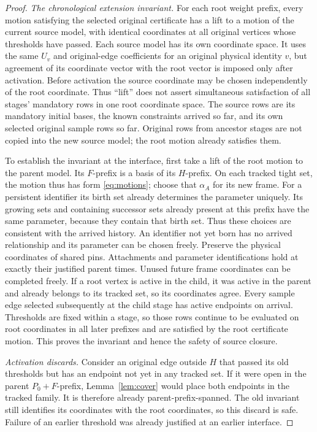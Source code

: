\documentclass[11pt,a4paper]{article}
\theoremstyle{definition}
\theoremstyle{remark}
\begin{document}
\begin{proof}
\emph{The chronological extension invariant.}
For each root weight prefix, every motion satisfying
the selected original certificate has a lift to a motion
of the current source model, with identical coordinates
at all original vertices whose thresholds have passed.
Each source model has its own coordinate space. It uses the same
$U_v$ and original-edge coefficients for an original physical
identity $v$, but agreement of its coordinate vector with the
root vector is imposed only after activation. Before activation
the source coordinate may be chosen independently of the root
coordinate. Thus ``lift'' does not assert simultaneous satisfaction
of all stages' mandatory rows in one root coordinate space.
The source rows are its mandatory initial bases,
the known constraints arrived so far, and its own
selected original sample rows so far.
Original rows from ancestor stages are not copied
into the new source model; the root motion already
satisfies them.

To establish the invariant at the interface, first take
a lift of the root motion to the parent model.
Its $F$-prefix is a basis of its $H$-prefix.
On each tracked tight set, the motion thus has
form \eqref{eq:motions}; choose that $\alpha_A$
for its new frame. For a persistent identifier its birth set
already determines the parameter uniquely. Its growing sets
and containing successor sets already present at this prefix
have the same parameter,
because they contain that birth set. Thus these choices are
consistent with the arrived history. An identifier not yet born
has no arrived relationship and its parameter can be chosen freely.
Preserve the physical coordinates of shared pins.
Attachments and parameter identifications hold
at exactly their justified parent times.
Unused future frame coordinates can be completed
freely. If a root vertex is active in the child,
it was active in the parent and already belongs
to its tracked set, so its coordinates agree.
Every sample edge selected subsequently at the
child stage has active endpoints on arrival.
Thresholds are fixed within a stage, so those rows
continue to be evaluated on root coordinates in
all later prefixes and are satisfied by the root
certificate motion.
This proves the invariant and hence the safety
of source closure.

\emph{Activation discards.}
Consider an original edge outside $H$ that passed
its old thresholds but has an endpoint not yet in
any tracked set. If it were open in the parent
$P_0+F$-prefix, Lemma~\ref{lem:cover} would place
both endpoints in the tracked family.
It is therefore already parent-prefix-spanned.
The old invariant still identifies its coordinates
with the root coordinates, so this discard is safe.
Failure of an earlier threshold was already justified
at an earlier interface.


\end{proof}
\end{document}
